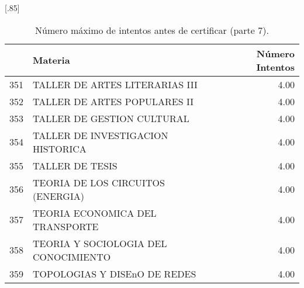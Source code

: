 \documentclass[12pt]{article}
\begin{document}
\begin{table}[ht]
\centering
\scalebox{0.75}[.85]{
\begin{tabular}{rlr}
  \hline
 & Materia & N\'umero Intentos\\ 
  \hline
  351 & TALLER DE ARTES LITERARIAS III & 4.00 \\ 
  352 & TALLER DE ARTES POPULARES II & 4.00 \\ 
  353 & TALLER DE GESTION CULTURAL & 4.00 \\ 
  354 & TALLER DE INVESTIGACION HISTORICA & 4.00 \\ 
  355 & TALLER DE TESIS & 4.00 \\ 
  356 & TEORIA DE LOS CIRCUITOS (ENERGIA) & 4.00 \\ 
  357 & TEORIA ECONOMICA DEL TRANSPORTE & 4.00 \\ 
  358 & TEORIA Y SOCIOLOGIA DEL CONOCIMIENTO & 4.00 \\ 
  359 & TOPOLOGIAS Y DISEnO DE REDES & 4.00 \\ 
   \hline
\end{tabular}
}
\caption{\label{Num_Max_Intentos_Cert_7} N\'umero m\'aximo de intentos antes de certificar (parte 7).}

\end{table}
\end{document}
